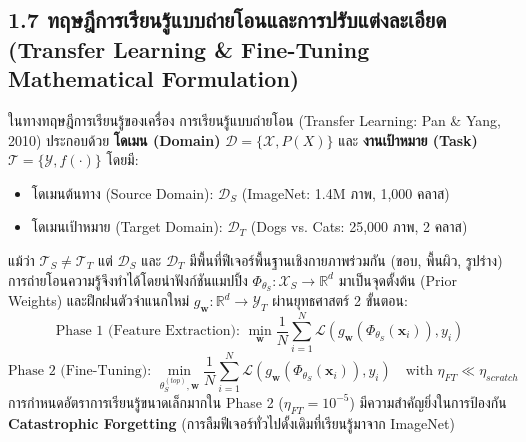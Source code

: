 \documentclass[12pt,a4paper]{article}
\begin{document}
\subsection*{1.7 ทฤษฎีการเรียนรู้แบบถ่ายโอนและการปรับแต่งละเอียด\\ \normalsize(Transfer Learning \& Fine-Tuning Mathematical Formulation)}
ในทางทฤษฎีการเรียนรู้ของเครื่อง การเรียนรู้แบบถ่ายโอน (Transfer Learning: Pan \& Yang, 2010) ประกอบด้วย \textbf{โดเมน (Domain)} $\mathcal{D} = \{\mathcal{X}, P(X)\}$ และ \textbf{งานเป้าหมาย (Task)} $\mathcal{T} = \{\mathcal{Y}, f(\cdot)\}$ โดยมี:
\begin{itemize}[leftmargin=1.8em, itemsep=1pt]
    \item โดเมนต้นทาง (Source Domain): $\mathcal{D}_S$ (ImageNet: 1.4M ภาพ, 1,000 คลาส)
    \item โดเมนเป้าหมาย (Target Domain): $\mathcal{D}_T$ (Dogs vs. Cats: 25,000 ภาพ, 2 คลาส)
\end{itemize}
แม้ว่า $\mathcal{T}_S \ne \mathcal{T}_T$ แต่ $\mathcal{D}_S$ และ $\mathcal{D}_T$ มีพื้นที่ฟีเจอร์พื้นฐานเชิงกายภาพร่วมกัน (ขอบ, พื้นผิว, รูปร่าง) การถ่ายโอนความรู้จึงทำได้โดยนำฟังก์ชันแมปปิ้ง $\Phi_{\theta_S}: \mathcal{X}_S \rightarrow \mathbb{R}^d$ มาเป็นจุดตั้งต้น (Prior Weights) และฝึกฝนตัวจำแนกใหม่ $g_{\mathbf{w}}: \mathbb{R}^d \rightarrow \mathcal{Y}_T$ ผ่านยุทธศาสตร์ 2 ขั้นตอน:
\begin{equation}
    \text{Phase 1 (Feature Extraction): } \min_{\mathbf{w}} \frac{1}{N} \sum_{i=1}^N \mathcal{L}\left( g_{\mathbf{w}}(\Phi_{\theta_S}(\mathbf{x}_i)), y_i \right)
\end{equation}
\begin{equation}
    \text{Phase 2 (Fine-Tuning): } \min_{\theta_S^{(top)}, \mathbf{w}} \frac{1}{N} \sum_{i=1}^N \mathcal{L}\left( g_{\mathbf{w}}(\Phi_{\theta_S}(\mathbf{x}_i)), y_i \right) \quad \text{with } \eta_{FT} \ll \eta_{scratch}
\end{equation}
การกำหนดอัตราการเรียนรู้ขนาดเล็กมากใน Phase 2 ($\eta_{FT} = 10^{-5}$) มีความสำคัญยิ่งในการป้องกัน \textbf{Catastrophic Forgetting} (การลืมฟีเจอร์ทั่วไปดั้งเดิมที่เรียนรู้มาจาก ImageNet)

\vspace{0.8em}
\end{document}
